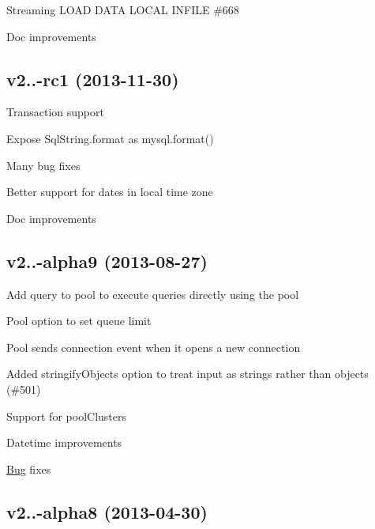 \begin{DoxyItemize}
\item Streaming L\+O\+A\+D D\+A\+T\+A L\+O\+C\+A\+L I\+N\+F\+I\+L\+E \#668
\item Doc improvements
\end{DoxyItemize}

\subsection*{v2..-\/rc1 (2013-\/11-\/30)}


\begin{DoxyItemize}
\item Transaction support
\item Expose Sql\+String.\+format as mysql.\+format()
\item Many bug fixes
\item Better support for dates in local time zone
\item Doc improvements
\end{DoxyItemize}

\subsection*{v2..-\/alpha9 (2013-\/08-\/27)}


\begin{DoxyItemize}
\item Add query to pool to execute queries directly using the pool
\item Pool option to set queue limit
\item Pool sends \textquotesingle{}connection\textquotesingle{} event when it opens a new connection
\item Added stringify\+Objects option to treat input as strings rather than objects (\#501)
\item Support for pool\+Clusters
\item Datetime improvements
\item \hyperlink{class_bug}{Bug} fixes
\end{DoxyItemize}

\subsection*{v2..-\/alpha8 (2013-\/04-\/30)}


